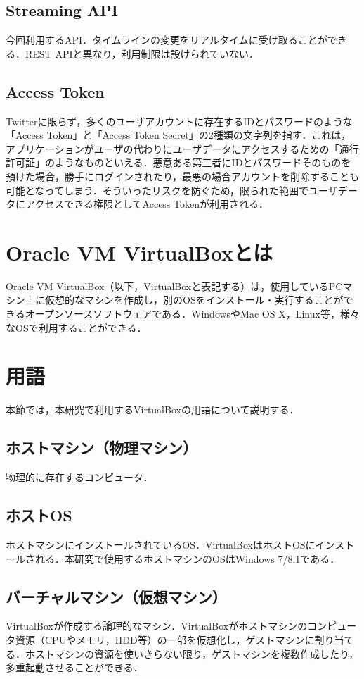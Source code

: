 \subsection{Streaming API}
今回利用するAPI．タイムラインの変更をリアルタイムに受け取ることができる．REST APIと異なり，利用制限は設けられていない．

\subsection{Access Token}
Twitterに限らず，多くのユーザアカウントに存在するIDとパスワードのような「Access Token」と「Access Token Secret」の2種類の文字列を指す．これは，アプリケーションがユーザの代わりにユーザデータにアクセスするための「通行許可証」のようなものといえる．悪意ある第三者にIDとパスワードそのものを預けた場合，勝手にログインされたり，最悪の場合アカウントを削除することも可能となってしまう．そういったリスクを防ぐため，限られた範囲でユーザデータにアクセスできる権限としてAccess Tokenが利用される\cite{whatsAccessToken}．

\section{Oracle VM VirtualBoxとは}
Oracle VM VirtualBox（以下，VirtualBoxと表記する）は，使用しているPCマシン上に仮想的なマシンを作成し，別のOSをインストール・実行することができるオープンソースソフトウェアである．WindowsやMac OS X，Linux等，様々なOSで利用することができる\cite{VBoxMania}．

\section{用語}
本節では，本研究で利用するVirtualBoxの用語について説明する．

\subsection{ホストマシン（物理マシン）}
物理的に存在するコンピュータ．

\subsection{ホストOS}
ホストマシンにインストールされているOS．VirtualBoxはホストOSにインストールされる．本研究で使用するホストマシンのOSはWindows 7/8.1である． 

\subsection{バーチャルマシン（仮想マシン）}
VirtualBoxが作成する論理的なマシン．VirtualBoxがホストマシンのコンピュータ資源（CPUやメモリ，HDD等）の一部を仮想化し，ゲストマシンに割り当てる．ホストマシンの資源を使いきらない限り，ゲストマシンを複数作成したり，多重起動させることができる．

